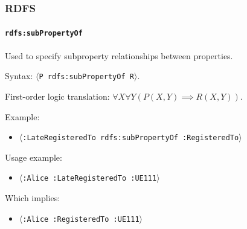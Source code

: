 \documentclass{beamer}
\newcommand{\triple}[1]{$\langle$\texttt{#1}$\rangle$}
\begin{document}
\begin{frame}
  \frametitle{RDFS}
  \framesubtitle{\texttt{rdfs:subPropertyOf}}

  Used to specify subproperty relationships between properties.

  \pause

  \bigskip

  Syntax: \triple{P rdfs:subPropertyOf R}.

  \pause

  \medskip

  First-order logic translation: $\forall X \forall Y (P(X, Y) \implies
                                                       R(X, Y))$.

  \pause

  \bigskip

  Example:

  \begin{itemize}
    \item \triple{:LateRegisteredTo rdfs:subPropertyOf :RegisteredTo}
  \end{itemize}

  \pause

  Usage example:

  \begin{itemize}
    \item \triple{:Alice :LateRegisteredTo :UE111}
  \end{itemize}

  \pause

  Which implies:

  \begin{itemize}
    \item \triple{:Alice :RegisteredTo :UE111}
  \end{itemize}
\end{frame}
\end{document}
